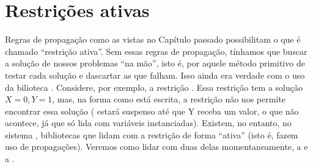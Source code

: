 \documentclass{article}
\begin{document}
\section{Restrições ativas}

Regras de propagação como as vistas no Capítulo passado possibilitam o que é chamado ``restrição
ativa''. Sem essas regras de
propagação, tínhamos que buscar a solução de nossos problemas ``na mão'', isto é, por aquele método primitivo de testar cada
solução e dascartar as que falham. Isso ainda era verdade com o uso da bilioteca
. Considere, por exemplo, a restrição . Essa restrição tem a solução ${X=0,Y=1}$, mas, na forma como está escrita, a restrição
não nos permite encontrar essa solução ( estará suspenso até que Y receba um valor, o
que não acontece, já que  só lida com variáveis instanciadas). Existem, no entanto, no
sistema \eclipse, bibliotecas que lidam com a restrição de forma ``ativa''
(isto é, fazem uso de propagações). Veremos como lidar com duas delas momentaneamente, a
 e a .
\end{document}
